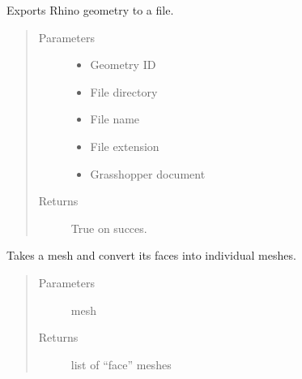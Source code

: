 \documentclass[letterpaper,10pt,english]{sphinxmanual}
\begin{document}
\begin{fulllineitems}
\label{\detokenize{lib:livestock.lib.geometry.export}}
Exports Rhino geometry to a file.
\begin{quote}\begin{description}
\item[{Parameters}] \leavevmode\begin{itemize}
\item {} 
 \textendash{} Geometry ID

\item {} 
 \textendash{} File directory

\item {} 
 \textendash{} File name

\item {} 
 \textendash{} File extension

\item {} 
 \textendash{} Grasshopper document

\end{itemize}

\item[{Returns}] \leavevmode
True on succes.

\end{description}\end{quote}

\end{fulllineitems}


\begin{fulllineitems}
\label{\detokenize{lib:livestock.lib.geometry.get_mesh_faces}}
Takes a mesh and convert its faces into individual meshes.
\begin{quote}\begin{description}
\item[{Parameters}] \leavevmode
{} \textendash{} mesh

\item[{Returns}] \leavevmode
list of “face” meshes

\end{description}\end{quote}

\end{fulllineitems}
\end{document}
